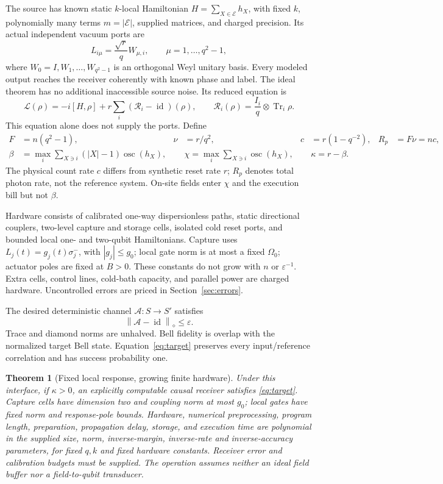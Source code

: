 \documentclass[11pt,a4paper]{article}
\newtheorem{theorem}{Theorem}\newtheorem{lemma}[theorem]{Lemma}\newtheorem{corollary}[theorem]{Corollary}
\newcommand{\id}{\operatorname{id}}\newcommand{\Tr}{\operatorname{Tr}}\newcommand{\osc}{\operatorname{osc}}
\newcommand{\norm}[1]{\left\lVert #1\right\rVert}\newcommand{\ket}[1]{\lvert #1\rangle}\newcommand{\bra}[1]{\langle #1\rvert}
\newcommand{\cA}{\mathcal A}\newcommand{\cC}{\mathcal C}\newcommand{\cD}{\mathcal D}\newcommand{\cR}{\mathcal R}
\begin{document}
The source has known static $k$-local Hamiltonian $H=\sum_{X\in\mathcal E}h_X$, with fixed $k$, polynomially many terms $m=|\mathcal E|$, supplied matrices, and charged precision. Its actual independent vacuum ports are
\begin{equation}
 L_{i\mu}=\frac{\sqrt r}{q}W_{\mu,i},\qquad \mu=1,\ldots,q^2-1,
\end{equation}
where $W_0=I,W_1,\ldots,W_{q^2-1}$ is an orthogonal Weyl unitary basis. Every modeled output reaches the receiver coherently with known phase and label. The ideal theorem has no additional inaccessible source noise. Its reduced equation is
\begin{equation}
 \mathcal L(\rho)=-i[H,\rho]+r\sum_i(\mathcal R_i-\id)(\rho),\qquad
 \mathcal R_i(\rho)=\frac{I_i}{q}\otimes\Tr_i\rho.
\end{equation}
This equation alone does not supply the ports. Define
\begin{align}
 F&=n(q^2-1),&\nu&=r/q^2,&c&=r(1-q^{-2}),&R_p&=F\nu=nc,\\
 \beta&=\max_i\sum_{X\ni i}(|X|-1)\osc(h_X),&&
 \chi=\max_i\sum_{X\ni i}\osc(h_X),&&\kappa=r-\beta.
\end{align}
The physical count rate $c$ differs from synthetic reset rate $r$; $R_p$ denotes total photon rate, not the reference system. On-site fields enter $\chi$ and the execution bill but not $\beta$.

Hardware consists of calibrated one-way dispersionless paths, static directional couplers, two-level capture and storage cells, isolated cold reset ports, and bounded local one- and two-qubit Hamiltonians. Capture uses $L_j(t)=g_j(t)\sigma_j^-$, with $|g_j|\le g_0$; local gate norm is at most a fixed $\Omega_0$; actuator poles are fixed at $B>0$. These constants do not grow with $n$ or $\varepsilon^{-1}$. Extra cells, control lines, cold-bath capacity, and parallel power are charged hardware. Uncontrolled errors are priced in Section~\ref{sec:errors}.

The desired deterministic channel $\cA:S\to S'$ satisfies
\begin{equation}
 \norm{\cA-\id}_\diamond\le\varepsilon.
 \label{eq:target}
\end{equation}
Trace and diamond norms are unhalved. Bell fidelity is overlap with the normalized target Bell state. Equation~\eqref{eq:target} preserves every input/reference correlation and has success probability one.

\begin{theorem}[Fixed local response, growing finite hardware]
\label{thm:positive}
Under this interface, if $\kappa>0$, an explicitly computable causal receiver satisfies \eqref{eq:target}. Capture cells have dimension two and coupling norm at most $g_0$; local gates have fixed norm and response-pole bounds. Hardware, numerical preprocessing, program length, preparation, propagation delay, storage, and execution time are polynomial in the supplied size, norm, inverse-margin, inverse-rate and inverse-accuracy parameters, for fixed $q,k$ and fixed hardware constants. Receiver error and calibration budgets must be supplied. The operation assumes neither an ideal field buffer nor a field-to-qubit transducer.
\end{theorem}
\end{document}
